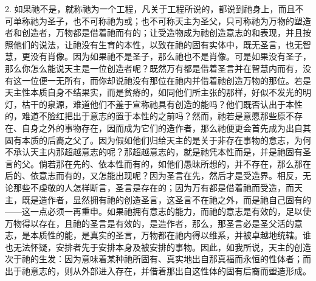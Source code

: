 2. 如果祂不是，就称祂为一个工程，凡关于工程所说的，都说到祂身上，而且不可单称祂为圣子，也不可称祂为或；也不可称天主为圣父，只可称祂为万物的塑造者和创造者，万物都是借着祂而有的；让受造物成为祂创造意志的和表现，并且按照他们的说法，让祂没有生育的本性，以致在祂的固有实体中，既无圣言，也无智慧，更没有肖像。因为如果祂不是圣子，那么祂也不是肖像。可是如果没有圣子，那么你怎么能说天主是一位创造者呢？既然万有都是借着圣言并在智慧内而有，没有这一位便一无所有，而你却说祂没有那位在祂内并借着祂创造万物的那位。若是天主性本质自身不结果实，而是贫瘠的，如同他们所主张的那样，好似不发光的明灯，枯干的泉源，难道他们不羞于宣称祂具有创造的能吗？他们既否认出于本性的，难道不脸红把出于意志的置于本性的之前吗？然而，祂若是意愿那些原不存在、自身之外的事物存在，因而成为它们的造作者，那么祂便更会首先成为出自其固有本质的后裔之父了。因为假如他们归给天主的是关于非存在事物的意志，为何不承认天主内那超越意志的呢？那超越意志的，就是祂凭本性而是，并是祂固有圣言的父。倘若那在先的、依本性而有的，如他们愚昧所想的，并不存在，那么那在后的、依意志而有的，又怎能出现呢？因为圣言在先，然后才是受造界。相反，无论那些不虔敬的人怎样断言，圣言是存在的；因为万有都是借着祂而受造，而天主，既是造作者，显然拥有祂的创造圣言，这圣言不在祂之外，而是祂自己固有的——这一点必须一再重申。如果祂拥有意志的能力，而祂的意志是有效的，足以使万物得以存在，且祂的圣言是有效的，是造作者，那么，那圣言必是圣父活的意志，是本质性的能，是真实的圣言，万物都在祂内得以维系，并被卓越地统辖。谁也无法怀疑，安排者先于安排本身及被安排的事物。因此，如我所说，天主的创造次于祂的生发：因为意味着某种祂所固有、真实地出自那真福而永恒的性体者；而出于祂意志的，则从外部进入存在，并借着那出自这性体的固有后裔而塑造形成。\par

